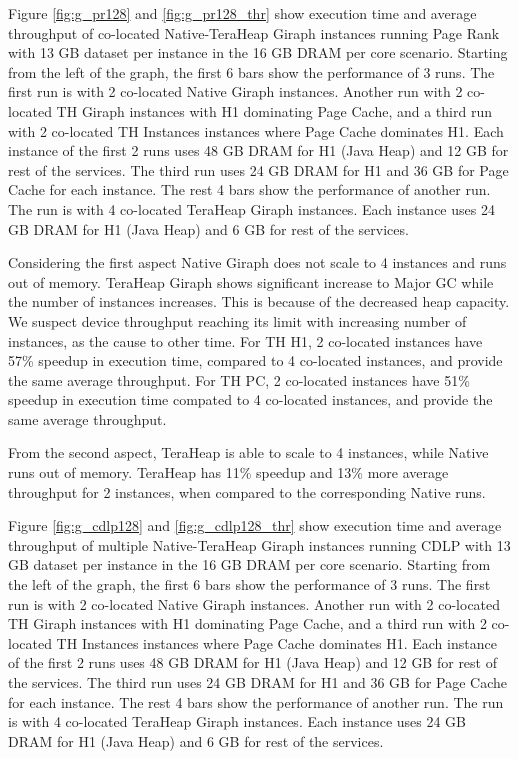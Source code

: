 Figure \ref{fig:g_pr128} and \ref{fig:g_pr128_thr} show execution time and average throughput of co-located
Native-TeraHeap Giraph instances running Page Rank with 13 GB
dataset per instance in the 16 GB DRAM per core scenario.
Starting from the left of the graph, the first 6 bars show the
performance of 3 runs. The first run is with 2 co-located Native Giraph instances.
Another run with 2 co-located TH Giraph instances with H1 dominating Page Cache,
and a third run with 2 co-located TH Instances instances where Page Cache dominates H1.
Each instance of the first 2 runs uses 48 GB DRAM for H1 (Java Heap) and 12 GB for rest of the services.
The third run uses 24 GB DRAM for H1 and 36 GB for Page Cache for each instance.
The rest 4 bars show the performance of another run. The run is with 4 co-located TeraHeap Giraph instances.
Each instance uses 24 GB DRAM for H1 (Java Heap) and 6 GB for rest of the services.


Considering the first aspect Native Giraph does not scale to 4 instances and runs out of memory. TeraHeap Giraph shows significant increase to Major GC while the number of instances increases. This is because of the decreased heap capacity. We suspect device throughput reaching its limit with increasing number of instances, as the cause to other time. For TH H1, 2 co-located instances have 57\% speedup in execution time, compared to 4 co-located instances, and provide the same average throughput. For TH PC, 2 co-located instances have 51\% speedup in execution time compated to 4 co-located instances, and provide the same average throughput.

From the second aspect, TeraHeap is able to scale to 4 instances, while Native runs out of memory. TeraHeap has 11\% speedup and 13\% more average throughput for 2 instances, when compared to the corresponding Native runs.

Figure \ref{fig:g_cdlp128} and \ref{fig:g_cdlp128_thr} show execution time and average throughput of multiple
Native-TeraHeap Giraph instances running CDLP with 13 GB
dataset per instance in the 16 GB DRAM per core scenario.
Starting from the left of the graph, the first 6 bars show the
performance of 3 runs. The first run is with 2 co-located Native Giraph instances.
Another run with 2 co-located TH Giraph instances with H1 dominating Page Cache,
and a third run with 2 co-located TH Instances instances where Page Cache dominates H1.
Each instance of the first 2 runs uses 48 GB DRAM for H1 (Java Heap) and 12 GB for rest of the services.
The third run uses 24 GB DRAM for H1 and 36 GB for Page Cache for each instance.
The rest 4 bars show the performance of another run. The run is with 4 co-located TeraHeap Giraph instances.
Each instance uses 24 GB DRAM for H1 (Java Heap) and 6 GB for rest of the services.

